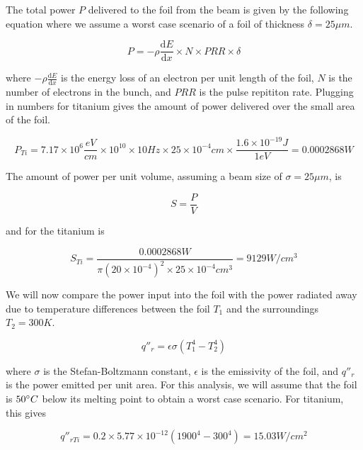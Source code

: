 \documentclass[12pt]{article}
\begin{document}
The total power $P$ delivered to the foil from the beam is given by the following equation where we assume a worst case scenario of a foil of thickness $\delta=25 \mu m$.

\begin{equation}
P=-\rho \frac{\mathrm{d} E}{\mathrm{d} x} \times N \times PRR \times \delta
\end{equation}

where $-\rho \frac{\mathrm{d} E}{\mathrm{d} x}$ is the energy loss of an electron per unit length of the foil, $N$ is the number of electrons in the bunch, and $PRR$ is the pulse repititon rate. Plugging in numbers for titanium gives the amount of power delivered over the small area of the foil.

\begin{equation}
P_{Ti}=7.17 \times 10^6 \frac{eV}{cm} \times 10^{10} \times 10 Hz \times 25 \times 10^{-4} cm \times \frac{1.6 \times 10^{-19} J}{1 eV}=0.0002868 W
\end{equation}

The amount of power per unit volume, assuming a beam size of $ \sigma = 25 \mu m$, is

\begin{equation}
S=\frac{P}{V}
\end{equation}

and for the titanium is

\begin{equation}
S_{Ti}=\frac{0.0002868 W}{\pi (20 \times 10^{-4})^2 \times 25 \times 10^{-4} cm^3}=9129 W/cm^3
\end{equation}

We will now compare the power input into the foil with the power radiated away due to temperature differences between the foil $T_1$ and the surroundings $T_2=300 K$.

\begin{equation}
q''_r=\epsilon \sigma (T_{1}^{4}-T_{2}^{4})
\end{equation}

where $\sigma$ is the Stefan-Boltzmann constant, $\epsilon$ is the emissivity of the foil, and $q''_r$ is the power emitted per unit area. For this analysis, we will assume that the foil is $50 \degree C$ below its melting point to obtain a worst case scenario. For titanium, this gives

\begin{equation}
q''_{r Ti}=0.2 \times 5.77 \times 10^{-12} (1900^{4}-300^{4})=15.03 W/cm^2
\end{equation}
\end{document}
